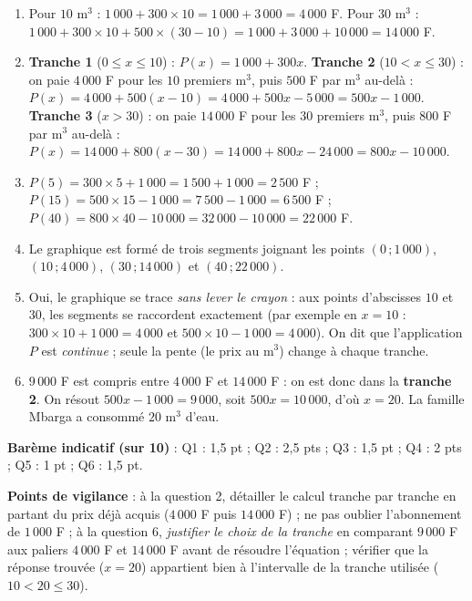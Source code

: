 \documentclass[11pt]{article}
\begin{document}
\begin{corrige}
\begin{enumerate}
\item Pour $10$ m$^3$ : $1\,000+300\times 10=1\,000+3\,000=4\,000$ F. Pour $30$ m$^3$ : $1\,000+300\times 10+500\times(30-10)=1\,000+3\,000+10\,000=14\,000$ F.
\item \textbf{Tranche 1} ($0\le x\le 10$) : $P(x)=1\,000+300x$. \textbf{Tranche 2} ($10<x\le 30$) : on paie $4\,000$ F pour les $10$ premiers m$^3$, puis $500$ F par m$^3$ au-delà : $P(x)=4\,000+500(x-10)=4\,000+500x-5\,000=500x-1\,000$. \textbf{Tranche 3} ($x>30$) : on paie $14\,000$ F pour les $30$ premiers m$^3$, puis $800$ F par m$^3$ au-delà : $P(x)=14\,000+800(x-30)=14\,000+800x-24\,000=800x-10\,000$.
\item $P(5)=300\times 5+1\,000=1\,500+1\,000=2\,500$ F ; $P(15)=500\times 15-1\,000=7\,500-1\,000=6\,500$ F ; $P(40)=800\times 40-10\,000=32\,000-10\,000=22\,000$ F.
\item Le graphique est formé de trois segments joignant les points $(0\,;1\,000)$, $(10\,;4\,000)$, $(30\,;14\,000)$ et $(40\,;22\,000)$.
\item Oui, le graphique se trace \emph{sans lever le crayon} : aux points d'abscisses $10$ et $30$, les segments se raccordent exactement (par exemple en $x=10$ : $300\times 10+1\,000=4\,000$ et $500\times 10-1\,000=4\,000$). On dit que l'application $P$ est \emph{continue} ; seule la pente (le prix au m$^3$) change à chaque tranche.
\item $9\,000$ F est compris entre $4\,000$ F et $14\,000$ F : on est donc dans la \textbf{tranche 2}. On résout $500x-1\,000=9\,000$, soit $500x=10\,000$, d'où $x=20$. La famille Mbarga a consommé $20$ m$^3$ d'eau.
\end{enumerate}

\textbf{Barème indicatif (sur 10)} : Q1 : 1,5 pt ; Q2 : 2,5 pts ; Q3 : 1,5 pt ; Q4 : 2 pts ; Q5 : 1 pt ; Q6 : 1,5 pt.

\textbf{Points de vigilance} : à la question 2, détailler le calcul tranche par tranche en partant du prix déjà acquis ($4\,000$ F puis $14\,000$ F) ; ne pas oublier l'abonnement de $1\,000$ F ; à la question 6, \emph{justifier le choix de la tranche} en comparant $9\,000$ F aux paliers $4\,000$ F et $14\,000$ F avant de résoudre l'équation ; vérifier que la réponse trouvée ($x=20$) appartient bien à l'intervalle de la tranche utilisée ($10<20\le 30$).
\end{corrige}
\end{document}
